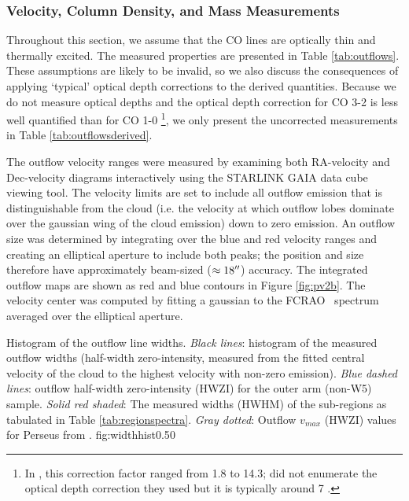 \subsubsection{Velocity, Column Density, and Mass Measurements}
\label{sec:measurements}
Throughout this section, we assume that the CO
lines are optically thin and thermally excited.   The measured properties
are presented in Table \ref{tab:outflows}.  These assumptions are
likely to be invalid, so we also discuss the consequences of applying `typical'
optical depth corrections to the derived quantities.   Because we do
not measure optical depths and the optical depth correction for CO 3-2 is less
well quantified than for CO 1-0 \citep{curtis2010,Cabrit1990}\footnote{In
\citet{curtis2010}, this correction factor ranged from 1.8 to 14.3;
\citet{arce2010} did not enumerate the optical depth correction they
used but it is typically around 7 \citep{Cabrit1990}.  }, we only present the
uncorrected measurements in Table \ref{tab:outflowsderived}.

The outflow velocity ranges were measured by examining
both RA-velocity and Dec-velocity diagrams interactively using the STARLINK
GAIA data cube viewing tool.  The velocity limits are set to include
all outflow emission that is distinguishable from the cloud (i.e. the velocity
at which outflow lobes dominate over the gaussian wing of the cloud
emission) down to zero emission.  An outflow size \citep[or lobe size,
following ][]{curtis2010} was determined by integrating over the blue and red
velocity ranges and creating an elliptical aperture to include both peaks; the
position and size therefore have approximately beam-sized ($\approx18\mbox{$^{\prime\prime}$}$)
accuracy.  The integrated outflow maps are shown as red and blue contours in
Figure \ref{fig:pv2b}.  The velocity center was computed by fitting a
gaussian to the FCRAO \thirteenco\ spectrum averaged over the elliptical
aperture.

{Histogram of the outflow line widths. {\it Black lines}: histogram of the measured
outflow widths (half-width zero-intensity, measured from the fitted central
velocity of the cloud to the highest velocity with non-zero emission).  {\it
Blue dashed lines}: outflow half-width zero-intensity (HWZI) for the outer arm (non-W5) sample.
{\it Solid red shaded}: The measured widths (HWHM) of the sub-regions as
tabulated in Table \ref{tab:regionspectra}.   
{\it Gray dotted}: Outflow $v_{max}$ (HWZI) values for Perseus
from \citet{curtis2010}. }
{fig:widthhist}{0.5}{0}


